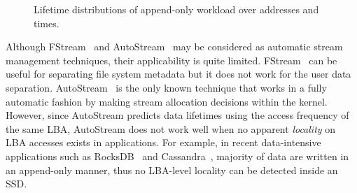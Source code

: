 \begin{figure}[t]
	\centering
	\hfill
	\hspace{10pt}
	\hfill
	\vspace{2pt}
	\hspace{10pt}
	\caption{Lifetime distributions of append-only workload over addresses and times.} %
	\label{fig:lba_lifetime}
\end{figure}


Although \textsf{\small FStream}~\cite{FStream} and \textsf{\small AutoStream}~\cite{AutoStream}
may be considered 
as automatic stream management techniques,
their applicability is quite limited.
\textsf{\small FStream}~\cite{FStream} can be useful for separating file system metadata but it does not
work for the user data separation.
\textsf{\small AutoStream}~\cite{AutoStream} is the only known technique that works in a 
fully automatic fashion by making stream allocation decisions within 
the kernel.
However, since \textsf{\small AutoStream} predicts data lifetimes using the
access frequency of the same LBA, \textsf{\small AutoStream} does not work well 
{\color{blue}
when no apparent {\it locality} on LBA accesses exists in applications.  
For example, in recent data-intensive applications 
such as RocksDB~\cite{RocksDB} and Cassandra~\cite{Cassandra}, 
majority of data are written in an append-only manner,
thus no LBA-level locality can be detected inside an SSD.
}

